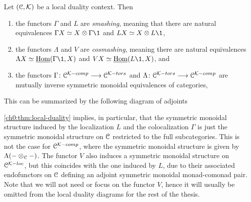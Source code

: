 \begin{theorem}
    \label{ch0:thm:local-duality}
    Let $(\EuScript{C}, \mathcal{K})$ be a local duality context. Then
    \begin{enumerate}
        \item the functors $\Gamma$ and $L$ are \emph{smashing}, meaning that there are natural equivalences $\Gamma X\simeq X\otimes \Gamma \1$ and $LX\simeq X\otimes L\1$,
        \item the functors $\Lambda$ and $V$ are \emph{cosmashing}, meaning there are natural equivalences $\Lambda X\simeq \iHom(\Gamma \1,X)$ and $VX\simeq \iHom(L\1, X)$, and 
        \item the functors $\Gamma\colon \EuScript{C}^{\mathcal{K}-comp}\longrightarrow \EuScript{C}^{\mathcal{K}-tors}$ and $\Lambda\colon \EuScript{C}^{\mathcal{K}-tors}\longrightarrow \EuScript{C}^{\mathcal{K}-comp}$ are mutually inverse symmetric monoidal equivalences of categories,
    \end{enumerate}
    This can be summarized by the following diagram of adjoints
    \begin{center}
    \end{center}
\end{theorem}

\begin{remark}
    \label{ch0:rm:monoidal-structure-in-local-duality}
    \cref{ch0:thm:local-duality} implies, in particular, that the symmetric monoidal structure induced by the localization $L$ and the colocalization $\Gamma$ is just the symmetric monoidal structure on $\EuScript{C}$ restricted to the full subcategories. This is not the case for $\EuScript{C}^{\mathcal{K}-comp}$, where the symmetric monoidal structure is given by $\Lambda(-\otimes_{\EuScript{C}}-)$. The functor $V$ also induces a symmetric monoidal structure on $\EuScript{C}^{\mathcal{K}-loc}$, but this coincides with the one induced by $L$, due to their associated endofunctors on $\EuScript{C}$ defining an adjoint symmetric monoidal monad-comonad pair. Note that we will not need or focus on the functor $V$, hence it will usually be omitted from the local duality diagrams for the rest of the thesis. 
\end{remark}

